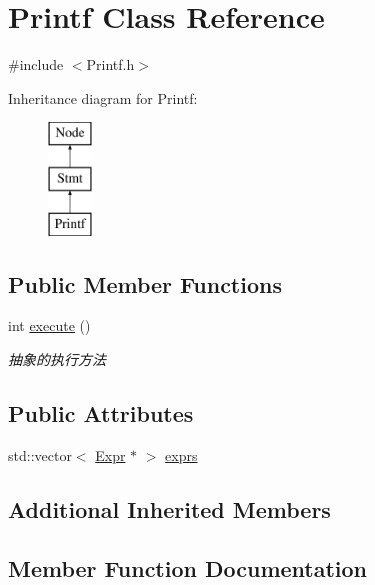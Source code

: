 \hypertarget{class_printf}{}\section{Printf Class Reference}
\label{class_printf}


{\ttfamily \#include $<$Printf.\+h$>$}

Inheritance diagram for Printf\+:\begin{figure}[H]
\begin{center}
\leavevmode
\includegraphics[height=3.000000cm]{class_printf}
\end{center}
\end{figure}
\subsection*{Public Member Functions}
\begin{DoxyCompactItemize}
\item 
int \hyperlink{class_printf_a0343199e28647ced40b9d74a284ff5f3}{execute} ()
\begin{DoxyCompactList}\small\item\em 抽象的执行方法 \end{DoxyCompactList}\end{DoxyCompactItemize}
\subsection*{Public Attributes}
\begin{DoxyCompactItemize}
\item 
std\+::vector$<$ \hyperlink{class_expr}{Expr} $\ast$ $>$ \hyperlink{class_printf_ab07a181eb9cd79c9018e172332d44ce5}{exprs}
\end{DoxyCompactItemize}
\subsection*{Additional Inherited Members}


\subsection{Member Function Documentation}
\mbox{\label{class_printf_a0343199e28647ced40b9d74a284ff5f3}} 
